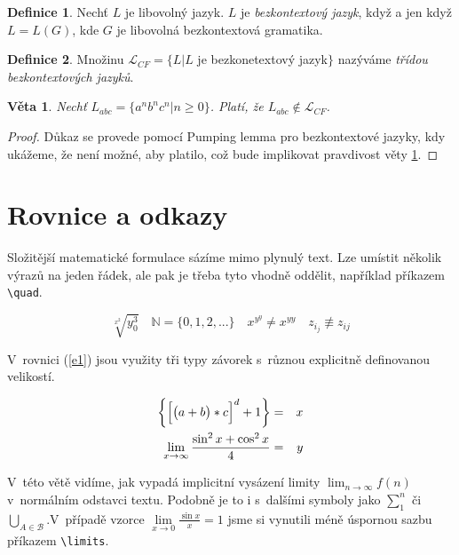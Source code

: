 \documentclass[11pt, a4paper]{article}
\theoremstyle{definition}
\newtheorem{definice}{Definice}[section]
\theoremstyle{plain}
\newtheorem{veta}{Věta}
\begin{document}
\begin{twocolumn}
\begin{definice}
Nechť $L$ je libovolný jazyk. $L$ je \emph{bezkontextový jazyk}, když a jen když $L = L(G)$, kde $G$ je libovolná bezkontextová gramatika.
\end{definice}

\begin{definice}
Množinu $\mathcal{L}_{CF} = \{L|L$ je bezkonetextový jazyk$\}$ nazýváme \emph{třídou bezkontextových jazyků}.
\end{definice}

\begin{veta}
\label{v1}
Nechť $L_{abc} = \{a^nb^nc^n|n \ge 0\}$. Platí, že $L_{abc} \notin \mathcal{L}_{CF}$.
\end{veta}

\begin{proof}
Důkaz se provede pomocí Pumping lemma pro bezkontextové jazyky, kdy ukážeme, že není možné, aby platilo, což bude implikovat pravdivost věty \ref{v1}.
\end{proof}

\section{Rovnice a odkazy}

Složitější matematické formulace sázíme mimo plynulý text. Lze umístit několik výrazů na jeden řádek, ale pak je třeba tyto vhodně oddělit, například příkazem \verb|\quad|. 

\begin{displaymath}
\sqrt[x^2]{y_0^3} \quad \mathbb{N}=\{0,1,2,...\} \quad x^{y^y} \neq x^{yy} \quad z_{i_j} \not\equiv z_{ij}
\end{displaymath}

V~rovnici (\ref{e1}) jsou využity tři typy závorek s~různou explicitně definovanou velikostí.

\setcounter{algoritmus}{1}

\begin{eqnarray}
\label{e1}
\bigg\{\Big[\big(a+b\big)*c\Big]^d+1\bigg\} &= &x \\
\medskip
\lim_{x \to \infty} \frac{\sin^2x+\cos^2x}{4} &= &y \nonumber
\end{eqnarray}

V~této větě vidíme, jak vypadá implicitní vysázení limity $\lim_{n \to \infty} f(n)$ v~normálním odstavci textu. Podobně je to i s~dalšími symboly jako $\sum_1^n$ či $\bigcup_{A\in \mathcal{B}}$.V~případě vzorce $\lim\limits_{x \to 0} \frac{\sin x}{x}=1$ jsme si vynutili méně úspornou \linebreak sazbu příkazem \verb|\limits|.


\end{twocolumn}
\end{document}
